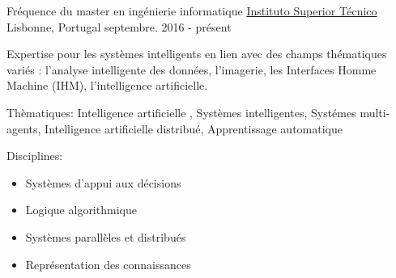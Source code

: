 


\begin{cventries}


\cventry
{Fréquence du master en ingénierie informatique} %
{\href{https://tecnico.ulisboa.pt/en/}{Instituto Superior Técnico}} %
{Lisbonne, Portugal} %
{septembre. 2016 - présent} %
{  %
\begin{cvitems}
\item {Expertise pour les systèmes intelligents en lien avec des champs thématiques variés : l'analyse intelligente des données, l'imagerie, les Interfaces Homme Machine (IHM), l'intelligence artificielle.}
\item{Thèmatiques: Intelligence artificielle , Systèmes intelligentes, Systémes multi-agents, Intelligence artificielle distribué, Apprentissage automatique}
\item{Disciplines:}
\begin{itemize}
\item Systèmes d'appui aux décisions
\item Logique algorithmique
\item Systèmes parallèles et distribués
\item Représentation des connaissances
\end{itemize}
\end{cvitems}
}



\end{cventries}
